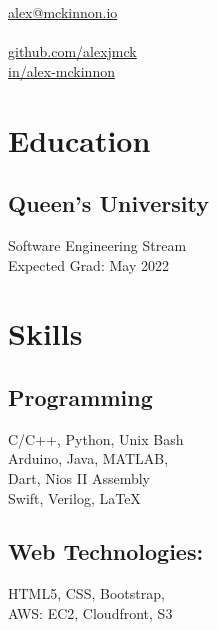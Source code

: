\documentclass[]{hieudo-build}
\begin{document}
%
%
{
	\faEnvelope \href{mailto:alex@mckinnon.io}{ alex@mckinnon.io}\\
	 \\
	\faGithub \href{https://github.com/alexjmck}{   github.com/alexjmck}\\
	\faLinkedin \href{https://www.linkedin.com/in/alex-mckinnon}{   in/alex-mckinnon}}

%
%
\begin{minipage}[t]{0.3\textwidth} 

\section{Education} 

\subsection{Queen's University}
Software Engineering Stream \\
Expected Grad: May 2022 \\
\sectionsep

\section{Skills}
\subsection{Programming}
C/C++, Python, Unix Bash\\ 
Arduino, Java, MATLAB, \\ 
Dart, Nios II Assembly\\ 
Swift, Verilog, \LaTeX

\subsection{Web Technologies:}
HTML5, CSS, Bootstrap, \\
AWS: EC2, Cloudfront, S3 \\


\end{minipage}
\end{document}
